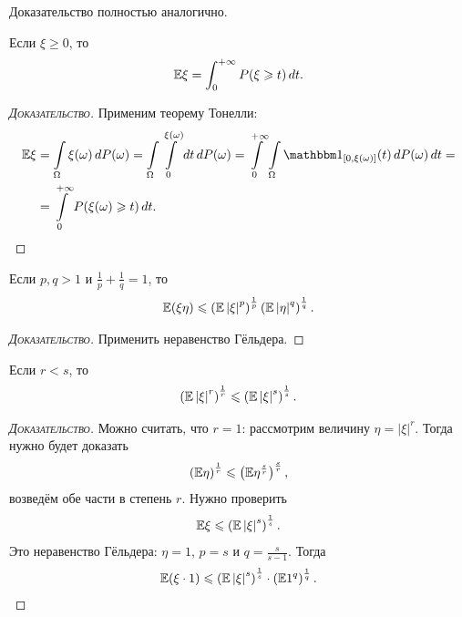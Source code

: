 \documentclass[../main.tex]{subfiles}
\begin{document}
Доказательство полностью аналогично.

\begin{prop}
 Если $ \xi \geqslant 0 $, то
 \begin{align*}
  \mathbb E\xi = \int_{0}^{+\infty} P(\xi \geqslant t)\,dt.
 \end{align*} 
\end{prop}
\begin{proof}[\normalfont\textsc{Доказательство}]
 Применим теорему Тонелли:
 \begin{align*}
  \E\xi &= \int\limits_{\Omega} \xi(\omega)\,dP(\omega) = \int\limits_{\Omega} \int\limits_{0}^{\xi(\omega)} dt\,dP(\omega) = \int\limits_{0}^{+\infty} \int\limits_{\Omega}   \Ind_{[0, \xi(\omega)]}(t)\,dP(\omega)\,dt = \\
  &= \int\limits_{0}^{+\infty} P(\xi(\omega) \geqslant t)\,dt.
 \end{align*} 
\end{proof}

\begin{prop}
 Если $ p, q > 1 $ и $ \frac{1}{p}+\frac{1}{q} = 1 $, то
 \begin{align*}
  \mathbb E(\xi\eta) \leqslant \left( \mathbb E \left| \xi \right|^{p} \right)^{\frac{1}{p}} \left( \mathbb E \left| \eta \right|^{q} \right)^{\frac{1}{q}}.
 \end{align*} 
\end{prop}
\begin{proof}[\normalfont\textsc{Доказательство}]
 Применить неравенство Гёльдера.
\end{proof}

\begin{prop}
 \label{proposition:Lyapunov_inequality}
 Если $ r < s $, то 
 \begin{align*}
  \left(\mathbb E \left| \xi \right|^{r} \right)^{\frac{1}{r}} \leqslant \left( \mathbb E \left| \xi \right|^{s} \right)^{\frac{1}{s}}.
 \end{align*} 
\end{prop}
\begin{proof}[\normalfont\textsc{Доказательство}]
 Можно считать, что $ r = 1 $: рассмотрим величину $ \eta = \left| \xi \right|^{r} $. Тогда нужно будет доказать
 \begin{align*}
  \left( \mathbb E \eta \right)^{\frac{1}{r}} \leqslant \left( \mathbb E\eta^{\frac{s}{r}} \right)^{\frac{s}{r}},
 \end{align*} возведём обе части в степень $ r $.
 Нужно проверить
 \begin{align*}
  \mathbb E\xi \leqslant \left( \mathbb E \left| \xi \right|^{s} \right)^{\frac{1}{s}}.
 \end{align*} Это неравенство Гёльдера: $ \eta = 1 $, $ p = s $ и $ q= \frac{s}{s-1} $. Тогда
 \begin{align*}
  \mathbb E(\xi \cdot 1) \leqslant \left( \mathbb E \left| \xi \right|^{s} \right)^{\frac{1}{s}} \cdot \left( \mathbb E 1^{q} \right)^{\frac{1}{q}}.
 \end{align*} 
\end{proof}
\end{document}
